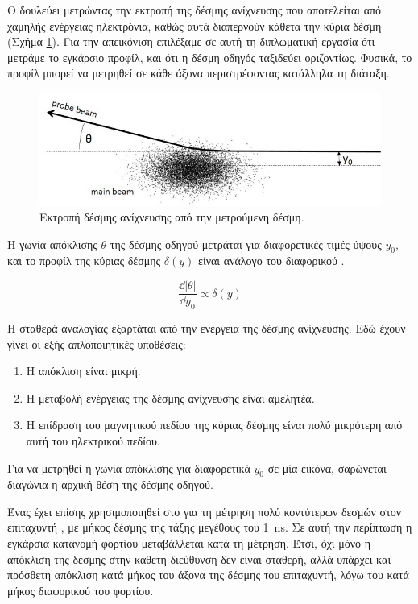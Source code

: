 Ο  δουλεύει μετρώντας την εκτροπή της δέσμης ανίχνευσης που αποτελείται από χαμηλής ενέργειας ηλεκτρόνια, καθώς αυτά διαπερνούν κάθετα την κύρια δέσμη (Σχήμα \ref{fig:beam-deflection}).
Για την απεικόνιση επιλέξαμε σε αυτή τη διπλωματική εργασία ότι μετράμε το εγκάρσιο προφίλ, και ότι η δέσμη οδηγός ταξιδεύει οριζοντίως. 
Φυσικά, το προφίλ μπορεί να μετρηθεί σε κάθε άξονα περιστρέφοντας κατάλληλα τη διάταξη. 


\begin{figure}[tph]
\includegraphics[width=0.8\linewidth]{figures/Beam-deflection}
\centering
\caption{Εκτροπή δέσμης ανίχνευσης από την μετρούμενη δέσμη.}
\label{fig:beam-deflection}
\end{figure}

Η γωνία απόκλισης $\theta$ της δέσμης οδηγού μετράται για διαφορετικές τιμές ύψους $y_0$, και το προφίλ της κύριας δέσμης $\delta (y)$ είναι ανάλογο του διαφορικού  \cite{Blokland2009}.

\begin{equation} \label{eq:transverseProfile}
\frac{\dd{} |\theta|}{\dd y_0} \propto \delta (y)
\end{equation}

Η σταθερά αναλογίας εξαρτάται από την ενέργεια της δέσμης ανίχνευσης. 
Εδώ έχουν γίνει οι εξής απλοποιητικές υποθέσεις:
\begin{enumerate}
\item Η απόκλιση είναι μικρή.
\item Η μεταβολή ενέργειας της δέσμης ανίχνευσης είναι αμελητέα.
\item Η επίδραση του μαγνητικού πεδίου της κύριας δέσμης είναι πολύ μικρότερη από αυτή του ηλεκτρικού πεδίου.
\end{enumerate} 

Για να μετρηθεί η γωνία απόκλισης για διαφορετικά $y_0$ σε μία εικόνα, σαρώνεται διαγώνια η αρχική θέση της δέσμης οδηγού. 

Ένας  έχει επίσης χρησιμοποιηθεί στο  για τη μέτρηση πολύ κοντύτερων δεσμών στον επιταχυντή  \cite{Logatchov2006}, με μήκος δέσμης της τάξης μεγέθους του \SI{1}{\nano \second}.
Σε αυτή την περίπτωση η εγκάρσια κατανομή φορτίου μεταβάλλεται κατά τη μέτρηση.
Έτσι, όχι μόνο η απόκλιση της δέσμης στην κάθετη διεύθυνση δεν είναι σταθερή, αλλά υπάρχει και πρόσθετη απόκλιση κατά μήκος του άξονα της δέσμης του επιταχυντή, λόγω του κατά μήκος διαφορικού του φορτίου.

